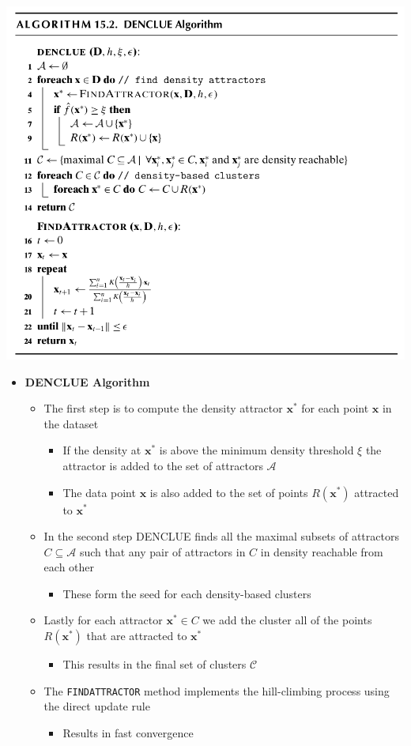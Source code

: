 \documentclass[11pt]{article}
\begin{document}
\begin{center}
\includegraphics[width=.9\linewidth]{Density-based Clustering/screenshot_2018-12-02_12-37-20.png}
\end{center}
\begin{itemize}
\item \textbf{DENCLUE Algorithm}
\begin{itemize}
\item The first step is to compute the density attractor \(\pmb x^*\) for each point \(\pmb x\) in the dataset
\begin{itemize}
\item If the density at \(\pmb x^*\) is above the minimum density threshold \(\xi\) the attractor is added to the set of attractors \(\mathcal A\)
\item The data point \(\pmb x\) is also added to the set of points \(R(\pmb x^*)\) attracted to \(\pmb x^*\)
\end{itemize}
\item In the second step DENCLUE finds all the maximal subsets of attractors \(C \subseteq \mathcal A\) such that any pair of attractors in \(C\) in density reachable from each other
\begin{itemize}
\item These form the seed for each density-based clusters
\end{itemize}
\item Lastly for each attractor \(\pmb x^* \in C\) we add the cluster all of the points \(R(\pmb x^*)\) that are attracted to \(\pmb x ^*\)
\begin{itemize}
\item This results in the final set of clusters \(\mathcal C\)
\end{itemize}
\item The \texttt{FINDATTRACTOR} method implements the hill-climbing process using the direct update rule
\begin{itemize}
\item Results in fast convergence
\end{itemize}
\end{itemize}
\end{itemize}
\end{document}
